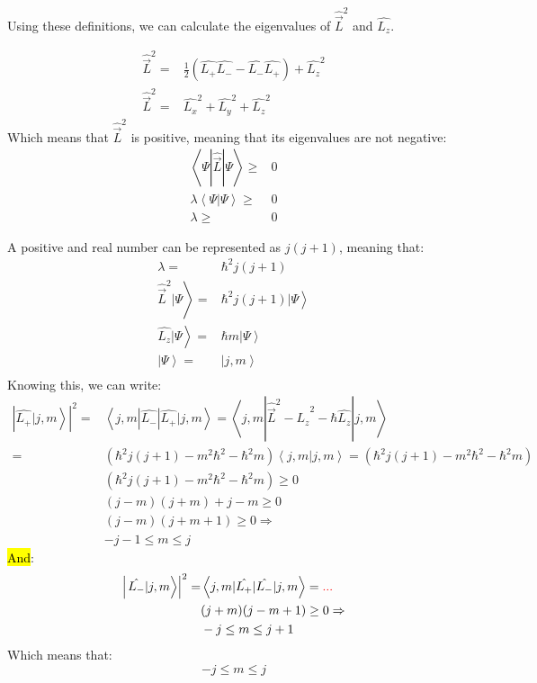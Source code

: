 		Using these definitions, we can calculate the eigenvalues of $\hat{\vec{L}}^2$ and $\hat{L_z}$.
		
		\begin{align}
			\hat{\vec{L}}^2 =& \frac{1}{2}\left(\hat{L_+}\hat{L_-} - \hat{L_-}\hat{L_+}\right) + \hat{L_z}^2 \\
			\hat\vec{{L}}^2 =& \hat{L_x}^2 + \hat{L_y}^2 + \hat{L_z}^2
		\end{align}
		Which means that $\hat{\vec{L}}^2$ is positive, meaning that its eigenvalues are not negative:
		\begin{align}
			\left\langle \Psi | \hat{\vec{L}} | \Psi \right\rangle \geq& 0 \\
			\lambda\left\langle \Psi | \Psi \right\rangle \geq& 0 \\
			\lambda \geq& 0 
		\end{align}
		
		A positive and real number can be represented as $j(j + 1)$, meaning that:
		\begin{align}
			\lambda =& \hbar^2 j(j+1) \\
			\left. \hat{\vec{L}}^2 | \Psi \right\rangle =& \left. \hbar^2 j(j+1)| \Psi \right\rangle \\
			\left. \hat{L_z} | \Psi \right\rangle =& \left. \hbar m | \Psi \right\rangle \\
			\left. |\Psi \right\rangle =& \left. |j,m \right\rangle \\ 
		\end{align}
		Knowing this, we can write:
		\begin{align}
			\left|\left. \hat{L_+}|j,m\right\rangle\right|^2 =& \left\langle j,m |\hat{L_-}|\hat{L_+}| j,m \right\rangle = \left\langle j,m |\hat{\vec{L}}^2 - \hat{L_z}^2 - \hbar\hat{L_z}| j,m \right\rangle \\
			=& \left(\hbar^2j(j+1) - m^2\hbar^2 - \hbar^2m\right)\left\langle j,m | j,m \right\rangle = \left(\hbar^2j(j+1) - m^2\hbar^2 - \hbar^2m\right) \\
			& \left(\hbar^2j(j+1) - m^2\hbar^2 - \hbar^2m\right) \geq 0 \\
			& (j - m)(j + m) + j-m \geq 0 \\
			& (j - m)(j + m + 1) \geq 0 \Rightarrow\\
			& -j-1 \leq m \leq j
		\end{align}
		\hl{And}:
		\begin{align}
			\left|\left. \hat{L_-}|j,m\right\rangle\right|^2 =& \left\langle j,m |\hat{L_+}|\hat{L_-}| j,m \right\rangle = \textcolor{red}{...} \\
			& (j + m)(j - m + 1) \geq 0 \Rightarrow\\
			& -j \leq m \leq j + 1
		\end{align}		
		Which means that:
		\begin{equation}
			- j \leq m \leq j		
		\end{equation}
		
